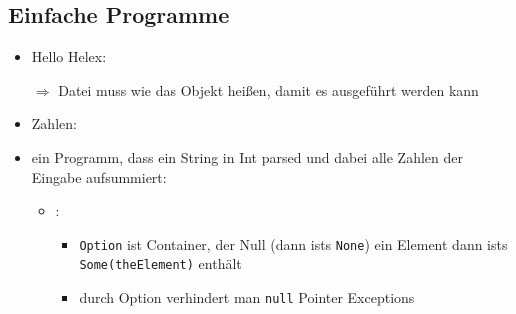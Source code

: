 \subsection{Einfache Programme}
\begin{itemize}
  \item Hello Helex:
  
  
  
  $\Rightarrow$ Datei muss wie das Objekt heißen, damit es ausgeführt werden
  kann
  \item Zahlen:
  
  
  
  \item ein Programm, dass ein String in Int parsed und dabei alle Zahlen der Eingabe aufsummiert:
  
  
  
  \begin{itemize}
    \item {}:
    \begin{itemize}
      \item \texttt{Option} ist Container, der Null (dann ists 
      \texttt{None}) \oder ein Element dann ists \texttt{Some(theElement)}
      enthält
      \item durch Option verhindert man \texttt{null} Pointer Exceptions
      

\end{itemize}
\end{itemize}
\end{itemize}
